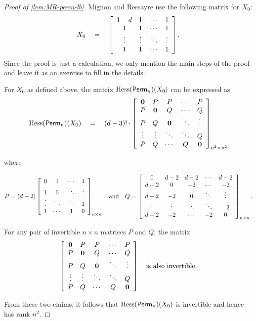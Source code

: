 \begin{proof}[Proof of \autoref{lem:MR-perm-lb}]
Mignon and Ressayre \cite{mr04} use the following matrix for $X_0$:
\[
X_0 \quad = \quad \left[ \begin{array}{cccc}
1-d & 1 & \cdots & 1\\
1 & 1 & \cdots & 1\\
\vdots & \vdots & \ddots & \vdots \\
1 & 1 & \cdots & 1
\end{array}\right].
\]
Since the proof is just a calculation, we only mention the main steps of the proof and leave it as an exercise to fill in the details.

\begin{claim}
For $X_0$ as defined above, the matrix $\operatorname{Hess}(\operatorname{\mathsf{Perm}}_n)(X_0)$ can be expressed as
\[
\operatorname{Hess}(\operatorname{\mathsf{Perm}}_n)(X_0) \quad = \quad (d-3)! \cdot \left[\begin{array}{ccccc}
\mathbf{0} & P & P & \cdots & P\\
P & \mathbf{0} & Q & \cdots & Q\\
P & Q & \mathbf{0} & \ddots & \vdots\\
\vdots & \vdots & \ddots & \ddots & Q \\
P & Q & \cdots & Q & \mathbf{0}
\end{array}\right]_{n^2 \times n^2}
\]
\begin{center}where
\end{center}
\[
P = (d-2) \left[\begin{array}{cccc}
0 & 1 & \cdots & 1\\
1 & 0 & \ddots & \vdots \\
\vdots & \ddots & \ddots & 1\\
1 & \cdots & 1 & 0
\end{array}\right]_{n \times n}
\quad \text{and} \quad
Q = 
\left[\begin{array}{ccccc}
0 & d-2 & d-2 & \cdots & d-2\\
d-2 & 0 & -2 & \cdots & -2\\
d-2 & -2 & 0 & \ddots & \vdots\\
\vdots & \vdots & \ddots & \ddots & -2 \\
d-2 & -2 & \cdots & -2 & 0
\end{array}\right]_{n \times n}.
\]
\end{claim}

\begin{claim}
For any pair of invertible $n\times n$ matrices $P$ and $Q$, the matrix 
\[\left[\begin{array}{ccccc}
\mathbf{0} & P & P & \cdots & P\\
P & \mathbf{0} & Q & \cdots & Q\\
P & Q & \mathbf{0} & \ddots & \vdots\\
\vdots & \vdots & \ddots & \ddots & Q \\
P & Q & \cdots & Q & \mathbf{0}
\end{array}\right]\quad\text{is also invertible.}
\]
\end{claim}

From these two claims, it follows that $\operatorname{Hess}(\operatorname{\mathsf{Perm}}_n)(X_0)$ is invertible and hence has rank $n^2$. 
\end{proof}

